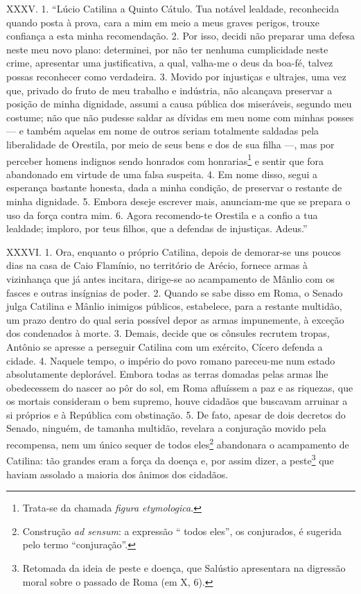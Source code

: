 XXXV. 1. “Lúcio Catilina a Quinto Cátulo. Tua notável lealdade, reconhecida
quando posta à prova, cara a mim em meio a meus graves perigos, trouxe
confiança a esta minha recomendação. 2. Por isso, decidi não preparar uma defesa
neste meu novo plano: determinei, por não ter nenhuma cumplicidade neste crime,
apresentar uma justificativa, a qual, valha-me o deus da boa-fé, talvez possas
reconhecer como verdadeira. 3. Movido por injustiças e ultrajes, uma vez que,
privado do fruto de meu trabalho e indústria, não alcançava preservar a posição
de minha dignidade, assumi a causa pública dos miseráveis, segundo meu costume;
não que não pudesse saldar as dívidas em meu nome com minhas posses --- e
também aquelas em nome de outros seriam totalmente saldadas pela liberalidade
de Orestila, por meio de seus bens e dos de sua filha ---, mas por perceber
homens indignos sendo honrados com honrarias\footnote{Trata-se da chamada
\emph{figura etymologica}.} e sentir que fora abandonado em virtude de uma
falsa suspeita. 4. Em nome disso, segui a esperança bastante honesta, dada a
minha condição, de preservar o restante de minha dignidade. 5. Embora deseje
escrever mais, anunciam-me que se prepara o uso da força contra mim. 6. Agora
recomendo-te Orestila e a confio a tua lealdade; imploro, por teus filhos, que
a defendas de injustiças. Adeus.”

XXXVI. 1. Ora, enquanto o próprio Catilina, depois de demorar-se uns poucos
dias na casa de Caio Flamínio, no território de Arécio, fornece armas à vizinhança
que já antes incitara, dirige-se ao acampamento de Mânlio com os fasces e
outras insígnias de poder. 2. Quando se sabe disso em Roma, o Senado julga
Catilina e Mânlio inimigos públicos, estabelece, para a restante multidão, um
prazo dentro do qual seria possível depor as armas impunemente, à exceção dos
condenados à morte. 3. Demais, decide que os cônsules recrutem tropas, Antônio
se apresse a perseguir Catilina com um exército, Cícero defenda a cidade. 4.
Naquele tempo, o império do povo romano pareceu-me num estado absolutamente
deplorável. Embora todas as terras domadas pelas armas lhe obedecessem do
nascer ao pôr do sol, em Roma afluíssem a paz e as riquezas, que os mortais
consideram o bem supremo, houve cidadãos que buscavam arruinar a si próprios e
à República com obstinação. 5. De fato, apesar de dois decretos do Senado,
ninguém, de tamanha multidão, revelara a conjuração movido pela recompensa,
nem um único sequer de todos eles\footnote{Construção \emph{ad sensum}: a
expressão `` todos eles'', os conjurados, é sugerida pelo termo
``conjuração''.} abandonara o acampamento de Catilina: tão  grandes eram a
força da doença e, por assim dizer, a peste\footnote{Retomada da ideia de peste
e doença, que Salústio apresentara na digressão moral sobre o passado de Roma
(em X, 6).} que haviam assolado a maioria dos ânimos dos cidadãos.

